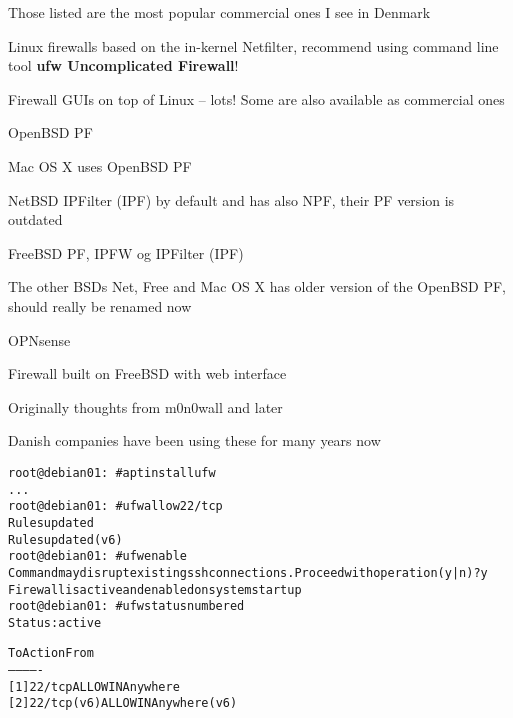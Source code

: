 \documentclass[Screen16to9,17pt]{foils}
\begin{document}
Those listed are the most popular commercial ones I see in Denmark


\begin{list2}
\item Linux firewalls based on the in-kernel Netfilter, recommend using command line tool {\bf ufw Uncomplicated Firewall}!
\item Firewall GUIs on top of Linux -- lots! Some are also available as commercial ones
\item OpenBSD PF
\item Mac OS X uses OpenBSD PF
\item NetBSD IPFilter (IPF) by default and has also NPF, their PF version is outdated
\item FreeBSD PF, IPFW og IPFilter (IPF) 
\item The other BSDs Net, Free and Mac OS X has older version of the OpenBSD PF, should really be renamed now
\end{list2}



\begin{list1}
\item OPNsense 
\item Firewall built on FreeBSD with web interface
\item Originally thoughts from m0n0wall and later \\
\item Danish companies have been using these for many years now
\end{list1}



\begin{alltt}\small
root@debian01:~# apt install ufw
...
root@debian01:~# ufw allow 22/tcp
Rules updated
Rules updated (v6)
root@debian01:~# ufw enable
Command may disrupt existing ssh connections. Proceed with operation (y|n)? y
Firewall is active and enabled on system startup
root@debian01:~# ufw status numbered
Status: active

     To                         Action      From
     --                         ------      ----
[ 1] 22/tcp                     ALLOW IN    Anywhere
[ 2] 22/tcp (v6)                ALLOW IN    Anywhere (v6)
\end{alltt}
\end{document}
